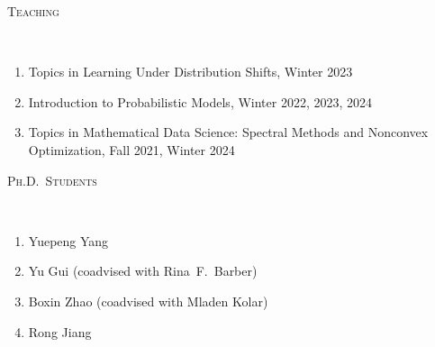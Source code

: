 \documentclass[a4paper, 10pt]{article}
\newenvironment{changemargin}[2]{%
  \begin{list}{}{%
    \setlength{\topsep}{0pt}%
    \setlength{\leftmargin}{#1}%
    \setlength{\rightmargin}{#2}%
    \setlength{\listparindent}{\parindent}%
    \setlength{\itemindent}{\parindent}%
    \setlength{\parsep}{\parskip}%
  }%
  \item[]}{\end{list}
}
\newcommand{\lineover}{
	\begin{changemargin}{-0.05in}{-0.05in}
		\vspace*{-8pt}
		\hrulefill \\
		\vspace*{-2pt}
	\end{changemargin}
}
\newcommand{\header}[1]{
	\begin{changemargin}{-0.5in}{-0.5in}
		\scshape{#1}\\
  	\lineover
	\end{changemargin}
}
\newenvironment{body} {
	\vspace*{-16pt}
	\begin{changemargin}{-0.3in}{-0.5in}
  }	
	{\end{changemargin}
}
\begin{document}
%
\bigskip
\header{\LARGE{Teaching}}
\begin{body}
	\vspace{18pt}
	\begin{enumerate}
	\item Topics in Learning Under Distribution Shifts, Winter 2023
	\item Introduction to Probabilistic Models, Winter 2022, 2023, 2024
	\item Topics in Mathematical Data Science: Spectral Methods and Nonconvex Optimization, Fall 2021, Winter 2024 
	\end{enumerate}
\end{body}

%
\bigskip
\header{\LARGE{Ph.D.~Students}}
\begin{body}
	\vspace{18pt}
	\begin{enumerate}
	\item Yuepeng Yang
	\item Yu Gui (coadvised with Rina~F.~Barber)
	\item Boxin Zhao (coadvised with Mladen Kolar)
	\item Rong Jiang
	\end{enumerate}
\end{body}

%
\end{document}
